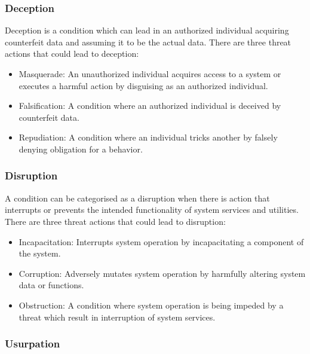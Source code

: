 \documentclass[conference]{IEEEtran}
\begin{document}
\subsubsection{Deception}

Deception is a condition which can lead in an authorized individual acquiring counterfeit data and
assuming it to be the actual data. There are three threat actions that could lead to deception:

\begin{itemize}

  \item Masquerade: An unauthorized individual acquires access to a system or executes a harmful
    action by disguising as an authorized individual.

  \item Falsification: A condition where an authorized individual is deceived by counterfeit data.

  \item Repudiation: A condition where an individual tricks another by falsely denying obligation
    for a behavior.

\end{itemize}

\subsubsection{Disruption}

A condition can be categorised as a disruption when there is action that interrupts or prevents the
intended functionality of system services and utilities. There are three threat actions that could
lead to disruption:

\begin{itemize}

  \item Incapacitation: Interrupts system operation by incapacitating a component of the system.

  \item Corruption: Adversely mutates system operation by harmfully altering system data or
    functions.

  \item Obstruction: A condition where system operation is being impeded by a threat which result in
    interruption of system services.

\end{itemize}

\subsubsection{Usurpation}
\end{document}
